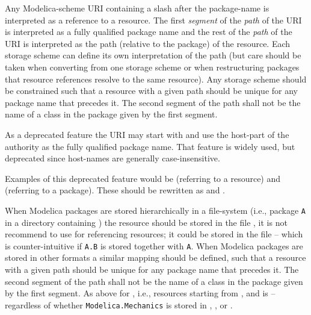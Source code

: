 Any Modelica-scheme URI containing a slash after the package-name is interpreted as a reference to a resource.
The first \emph{segment} of the \emph{path} of the URI is interpreted as a fully qualified package name and the rest of the \emph{path} of the URI is interpreted as the path (relative to the package) of the resource.
Each storage scheme can define its own interpretation of the path (but care should be taken when converting from one storage scheme or when restructuring packages that resource references resolve to the same resource).
Any storage scheme should be constrained such that a resource with a given path should be unique for any package name that precedes it.
The second segment of the path shall not be the name of a class in the package given by the first segment.

As a deprecated feature the URI may start with  and use the host-part of the authority as the fully qualified package name.
That feature is widely used, but deprecated since host-names are generally case-insensitive.
\begin{nonnormative}
Examples of this deprecated feature would be  (referring to a resource) and  (referring to a package).
These should be rewritten as  and .
\end{nonnormative}

When Modelica packages are stored hierarchically in a file-system (i.e., package \lstinline!A! in a directory  containing ) the resource
 should be stored in the file , it is not recommend to use  for referencing resources; it could be stored in the file  -- which is counter-intuitive if \lstinline!A.B! is stored together with \lstinline!A!.
When Modelica packages are stored in other formats a similar mapping should be defined, such that a resource with a given path should be unique for any package name that precedes it.
The second segment of the path shall not be the name of a class in the package given by the first segment.
As above for , i.e., resources starting from , and  is  -- regardless of whether \lstinline!Modelica.Mechanics! is stored in , , or .

